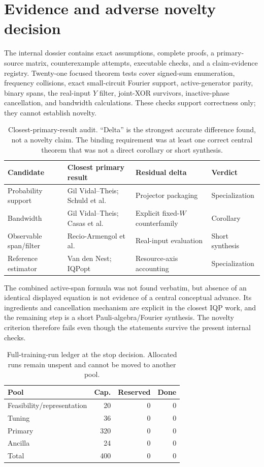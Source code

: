 \documentclass[a4paper,twocolumn,11pt,unpublished]{quantumarticle}
\begin{document}
\section{Evidence and adverse novelty decision}
\label{sec:evidence}

The internal dossier contains exact assumptions, complete proofs, a
primary-source matrix, counterexample attempts, executable checks, and a
claim-evidence registry.  Twenty-one focused theorem tests cover signed-sum
enumeration, frequency collisions, exact small-circuit Fourier support,
active-generator parity, binary spans, the real-input $Y$ filter, joint-XOR
survivors, inactive-phase cancellation, and bandwidth calculations.  These
checks support correctness only; they cannot establish novelty.

\begin{table}[t]
\centering
\caption{Closest-primary-result audit. ``Delta'' is the strongest accurate
difference found, not a novelty claim. The binding requirement was at least one
correct central theorem that was not a direct corollary or short synthesis.}
\label{tab:novelty}
\small
\begin{tabular}{llll}
\toprule
Candidate & Closest primary result & Residual delta & Verdict \\
\midrule
Probability support & Gil Vidal--Theis; Schuld et al. & Projector packaging & Specialization \\
Bandwidth & Gil Vidal--Theis; Casas et al. & Explicit fixed-$W$ counterfamily & Corollary \\
Observable span/filter & Recio-Armengol et al. & Real-input evaluation & Short synthesis \\
Reference estimator & Van den Nest; IQPopt & Resource-axis accounting & Specialization \\
\bottomrule
\end{tabular}
\end{table}

The combined active-span formula was not found verbatim, but absence of an
identical displayed equation is not evidence of a central conceptual advance.
Its ingredients and cancellation mechanism are explicit in the closest IQP
work, and the remaining step is a short Pauli-algebra/Fourier synthesis.  The
novelty criterion therefore fails even though the statements survive the
present internal checks.

\begin{table}[t]
\centering
\caption{Full-training-run ledger at the stop decision. Allocated runs remain
unspent and cannot be moved to another pool.}
\label{tab:ledger}
\footnotesize
\begin{tabular}{@{}lrrr@{}}
\toprule
Pool & Cap. & Reserved & Done \\
\midrule
Feasibility/representation & 20 & 0 & 0 \\
Tuning & 36 & 0 & 0 \\
Primary & 320 & 0 & 0 \\
Ancilla & 24 & 0 & 0 \\
\midrule
Total & 400 & 0 & 0 \\
\bottomrule
\end{tabular}
\end{table}
\end{document}
